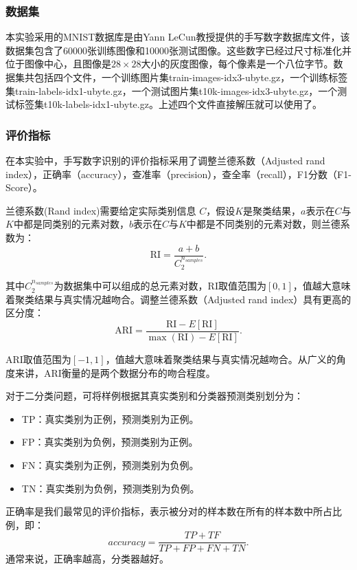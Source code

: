 \documentclass[UTF8]{ctexart}
\begin{document}
\subsubsection{数据集}
本实验采用的MNIST数据库是由Yann LeCun教授提供的手写数字数据库文件，该数据集包含了60000张训练图像和10000张测试图像。这些数字已经过尺寸标准化并位于图像中心，且图像是$28 \times 28$大小的灰度图像，每个像素是一个八位字节。数据集共包括四个文件，一个训练图片集train-images-idx3-ubyte.gz，一个训练标签集train-labels-idx1-ubyte.gz，一个测试图片集t10k-images-idx3-ubyte.gz，一个测试标签集t10k-labels-idx1-ubyte.gz。上述四个文件直接解压就可以使用了。

\subsubsection{评价指标}

在本实验中，手写数字识别的评价指标采用了调整兰德系数（Adjusted rand index），正确率（accuracy），查准率（precision），查全率（recall），F1分数（F1-Score）。

兰德系数(Rand index)需要给定实际类别信息 $C$，假设$K$是聚类结果，$a$表示在$C$与$K$中都是同类别的元素对数，$b$表示在$C$与$K$中都是不同类别的元素对数，则兰德系数为：
\begin{equation}
\mathrm{RI}=\frac{a+b}{C_{2}^{n_{samples}}}.
\end{equation}

其中$C_{2}^{n_{samples}}$为数据集中可以组成的总元素对数，RI取值范围为$[0,1]$，值越大意味着聚类结果与真实情况越吻合。调整兰德系数（Adjusted rand index）具有更高的区分度：
\begin{equation}
\mathrm{ARI}=\frac{\mathrm{RI}-E[\mathrm{RI}]}{\max (\mathrm{RI})-E[\mathrm{RI}]}.
\end{equation}

ARI取值范围为$[-1,1]$，值越大意味着聚类结果与真实情况越吻合。从广义的角度来讲，ARI衡量的是两个数据分布的吻合程度。

对于二分类问题，可将样例根据其真实类别和分类器预测类别划分为：
\begin{itemize}
	\item TP：真实类别为正例，预测类别为正例。
	\item FP：真实类别为负例，预测类别为正例。
	\item FN：真实类别为正例，预测类别为负例。
	\item TN：真实类别为负例，预测类别为负例。
\end{itemize}

正确率是我们最常见的评价指标，表示被分对的样本数在所有的样本数中所占比例，即：
\begin{equation}
accuracy = \frac{TP+TF}{TP+FP+FN+TN}.
\end{equation}
通常来说，正确率越高，分类器越好。
\end{document}
